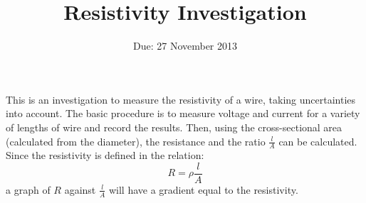 \documentclass[11pt]{article}
\title{Resistivity Investigation}
\author{}
\date{Due: 27 November 2013}
\begin{document}
\maketitle \thispagestyle{empty}
\begin{adjustwidth}{2cm}{2cm}
This is an investigation to measure the resistivity of a wire, taking uncertainties into account.  The basic procedure is to measure voltage and current for a variety of lengths of wire and record the results.  Then, using the cross-sectional area (calculated from the diameter), the resistance and the ratio $ \frac{l}{A} $ can be calculated.  Since the resistivity is defined in the relation: \[ R = \rho \frac{l}{A} \] a graph of $ R $ against $ \frac{l}{A} $ will have a gradient equal to the resistivity.
\end{adjustwidth}
\end{document}
